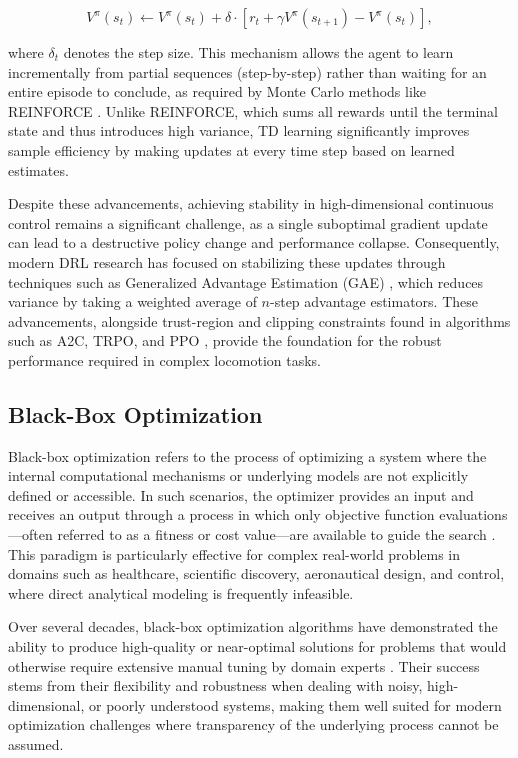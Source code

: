 \begin{equation} \label{eq:td_error}
V^\pi(s_t) \leftarrow V^\pi(s_t) + \delta \cdot [r_t + \gamma V^\pi(s_{t+1}) - V^\pi(s_t)],
\end{equation}

where $\delta_t$ denotes the step size. This mechanism allows the agent to learn incrementally from partial sequences  (step-by-step) rather than waiting for an entire episode to conclude, as required by Monte Carlo methods like REINFORCE \citep{williams1992reinforce}. Unlike REINFORCE, which sums all rewards until the terminal state and thus introduces high variance, TD learning significantly improves sample efficiency by making updates at every time step based on learned estimates.

Despite these advancements, achieving stability in high-dimensional continuous control remains a significant challenge, as a single suboptimal gradient update can lead to a destructive policy change and performance collapse. Consequently, modern DRL research has focused on stabilizing these updates through techniques such as Generalized Advantage Estimation (GAE) \citep{schulman2016gae}, which reduces variance by taking a weighted average of $n$-step advantage estimators. These advancements, alongside trust-region and clipping constraints found in algorithms such as A2C, TRPO, and PPO \citep{mnih2016a3c,schulman2015trpo,schulman2017ppo}, provide the foundation for the robust performance required in complex locomotion tasks.

\subsection{Black-Box Optimization}

Black-box optimization refers to the process of optimizing a system where the internal computational mechanisms or underlying models are not explicitly defined or accessible. In such scenarios, the optimizer provides an input and receives an output through a process in which only objective function evaluations—often referred to as a fitness or cost value—are available to guide the search \citep{eiben2015ec}. This paradigm is particularly effective for complex real-world problems in domains such as healthcare, scientific discovery, aeronautical design, and control, where direct analytical modeling is frequently infeasible.

Over several decades, black-box optimization algorithms have demonstrated the ability to produce high-quality or near-optimal solutions for problems that would otherwise require extensive manual tuning by domain experts \citep{wierstra2011nes}. Their success stems from their flexibility and robustness when dealing with noisy, high-dimensional, or poorly understood systems, making them well suited for modern optimization challenges where transparency of the underlying process cannot be assumed.

